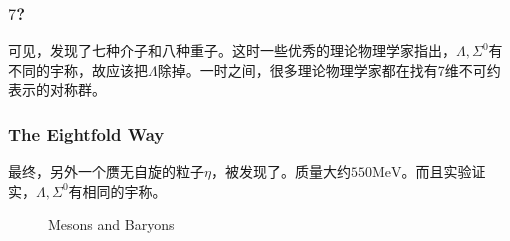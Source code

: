 \documentclass[CJK]{beamer}
\begin{document}
\begin{frame}\frametitle{\bch $7$?\ech}
  \bch
  可见，发现了七种介子和八种重子。这时一些优秀的理论物理学家指出，$\Lambda,\Sigma^0$有不同的宇称，故应该把$\Lambda$除掉。一时之间，很多理论物理学家都在找有7维不可约表示的对称群。
  \ech
\end{frame}
\begin{frame}\frametitle{\bch The Eightfold Way\ech}
  \bch
  最终，另外一个赝无自旋的粒子$\eta$，被发现了。质量大约$550\mathrm{MeV}$。而且实验证实，$\Lambda,\Sigma^0$有相同的宇称。
  \begin{figure}
\centering  
{}
\caption{Mesons and Baryons}
\end{figure}
  \ech
\end{frame}
\end{document}
